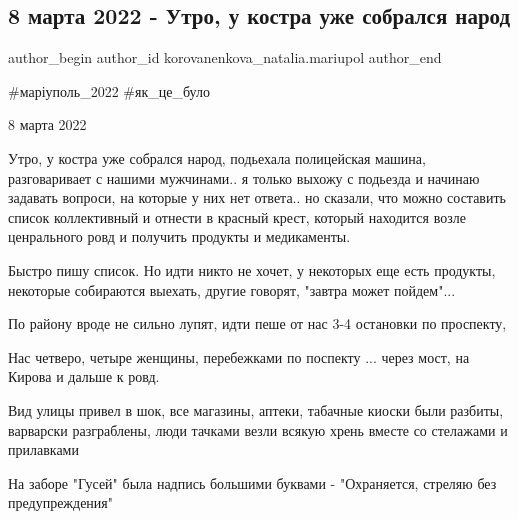  
 
 
 
 

\subsection{8 марта 2022 - Утро, у костра уже собрался народ}
\label{sec:08_03_2023.fb.korovanenkova_natalia.mariupol.1.jak_ce_bulo_8_marta}

\ifcmt
 author_begin
   author_id korovanenkova_natalia.mariupol
 author_end
\fi

\#маріуполь\_2022 \#як\_це\_було

8 марта 2022

Утро, у костра уже собрался народ, подьехала полицейская машина,
разговаривает с нашими мужчинами.. я только выхожу с подьезда и начинаю
задавать вопроси, на которые у них нет ответа.. но сказали, что можно
составить список коллективный и отнести в красный крест, который находится
возле ценрального ровд и получить продукты и медикаменты.

Быстро пишу список. Но идти никто не хочет, у некоторых еще есть продукты,
некоторые собираются выехать, другие говорят, "завтра может пойдем"...

По району вроде не сильно лупят, идти пеше от нас 3-4 остановки по проспекту, 

Нас четверо, четыре женщины,  перебежками  по поспекту ...  через мост, на
Кирова и дальше к ровд.


Вид улицы привел в шок, все магазины, аптеки, табачные киоски были разбиты,
варварски разграблены, люди тачками везли всякую хрень вместе со стелажами и
прилавками

На заборе "Гусей" была надпись большими буквами - "Охраняется, стреляю без
предупреждения"

